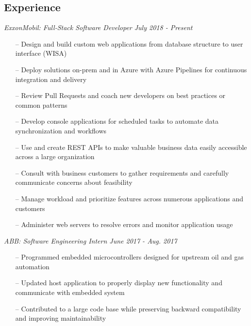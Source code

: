 \documentclass[line,overlapped,9pt]{res}
\begin{document}
\setlength\itemsep{.25em}
\address{Email: kllinzy1@gmail.com}
\address{Mobile: (918)440-3563}

\begin{resume}

  \section{Experience} {\sl ExxonMobil: Full-Stack Software Developer \hfill July 2018 - \sl Present}
                 \begin{itemize}   %
                 \item[--] Design and build custom web applications from database structure to user interface (WISA)
                 \item[--] Deploy solutions on-prem and in Azure with Azure Pipelines for continuous integration
                   and delivery
                 \item[--] Review Pull Requests and coach new developers on best practices or common patterns
                 \item[--] Develop console applications for scheduled tasks to automate data synchronization
                   and workflows
                 \item[--] Use and create REST APIs to make valuable business data easily accessible across
                   a large organization 
                 \item[--] Consult with business customers to gather requirements and carefully communicate
                   concerns about feasibility
                 \item[--] Manage workload and prioritize features across numerous applications and customers
                \item[--] Administer web servers to resolve errors and monitor application usage
                 \end{itemize}
                 
                 {\sl ABB: Software Engineering Intern  \hfill June 2017 - Aug. 2017 }
                 \begin{itemize}  %
                 \item[--] Programmed embedded microcontrollers designed for upstream
                   oil and gas automation 
                 \item[--] Updated host application to properly display new functionality and
                   communicate with embedded system
                 \item[--] Contributed to a large code base while preserving 
                   backward compatibility and improving maintainability
                 \end{itemize} 


\end{resume}
\end{document}
